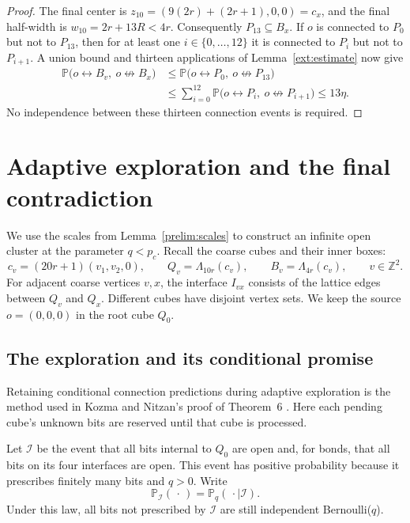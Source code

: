 \documentclass[11pt]{article}
\theoremstyle{definition}
\theoremstyle{remark}
\numberwithin{equation}{section}
\begin{document}
\begin{proof}
The final center is
$z_{10}=(9(2r)+(2r+1),0,0)=c_x$, and the final half-width is
$w_{10}=2r+13R<4r$. Consequently $P_{13}\subseteq B_x$. If $o$ is connected
to $P_0$ but not to $P_{13}$, then for at least one $i\in\{0,\ldots,12\}$
it is connected to $P_i$ but not to $P_{i+1}$. A union bound and thirteen
applications of Lemma~\ref{ext:estimate} now give
\[
\begin{split}
  \mathbb P\bigl(o\leftrightarrow B_v,\ o\not\leftrightarrow B_x\bigr)
  &\le
  \mathbb P\bigl(o\leftrightarrow P_0,\ o\not\leftrightarrow P_{13}\bigr)\\
  &\le \sum_{i=0}^{12}
       \mathbb P\bigl(o\leftrightarrow P_i,\ o\not\leftrightarrow P_{i+1}\bigr)
   \le 13\eta.
\end{split}
\]
No independence between these thirteen connection events is required.
\end{proof}

\section{Adaptive exploration and the final contradiction}
\label{sec:exploration}

We use the scales from Lemma~\ref{prelim:scales} to construct an infinite
open cluster at the parameter $q<p_c$. Recall the coarse cubes and their
inner boxes:
\[
 c_v=(20r+1)(v_1,v_2,0),\qquad
 Q_v=\Lambda_{10r}(c_v),\qquad B_v=\Lambda_{4r}(c_v),
 \qquad v\in\mathbb Z^2.
\]
For adjacent coarse vertices $v,x$, the interface $I_{vx}$ consists of the
lattice edges between $Q_v$ and $Q_x$. Different cubes have disjoint
vertex sets. We keep the source $o=(0,0,0)$ in the root cube $Q_0$.

\subsection{The exploration and its conditional promise}

Retaining conditional connection predictions during adaptive exploration
is the method used in Kozma and Nitzan's proof of Theorem~6
\cite[Section~4, equations~(30)--(32)]{KozmaNitzan2024}.
Here each pending cube's unknown bits are reserved until that cube is processed.

Let $\mathcal I$ be the event that all bits internal to $Q_0$ are open
and, for bonds, that all bits on its four interfaces are open. This event
has positive probability because it prescribes finitely many bits and
$q>0$. Write
\[
 \mathbb P_{\mathcal I}(\,\cdot\,)
   =\mathbb P_q(\,\cdot\mid\mathcal I).
\]
Under this law, all bits not prescribed by $\mathcal I$ are still
independent Bernoulli($q$).
\end{document}
